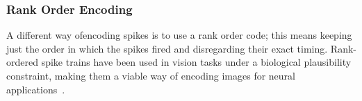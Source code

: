 \subsubsection{Rank Order Encoding}
A different way ofencoding spikes is to use a rank order code; this means
keeping just the order in which the spikes fired and disregarding their exact timing.
Rank-ordered spike trains have been used in vision tasks under a biological plausibility constraint, making them a viable way of encoding images for neural applications~\cite{van2001rate,sen2009evaluating,masmoudi2010novel}.
%
%		
%		
%		
